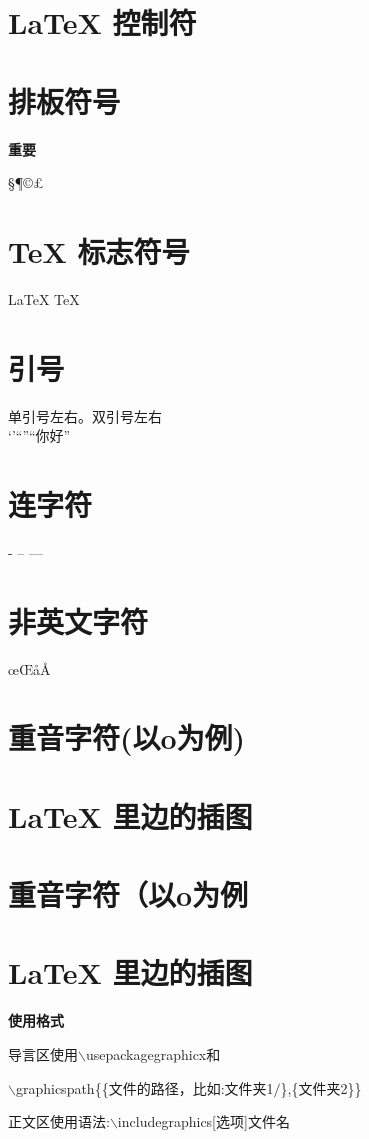 \documentclass[fontset=windows]{article}
\begin{document}
    \section{\LaTeX{} 控制符}
    \section{排板符号}
    \textbf{重要}

    \S \P \dag \ddag \copyright \pounds
    \section{\TeX{} 标志符号}
    \LaTeX{} \TeX{} \LaTeXe{} %
    \section{引号}
    单引号左右。双引号左右\\
    `'``''``你好''
    \section{连字符}
    - -- ---
    \section{非英文字符}
    \oe \OE  \aa \AA
    \section{重音字符(以o为例)}
    \section{\LaTeX{} 里边的插图}
    \section{重音字符（以o为例}

    \section{\LaTeX{} 里边的插图}
    \textbf{使用格式}

    导言区使用$\backslash$usepackage{graphicx}和

    $\backslash$graphicspath\{\{文件的路径，比如:文件夹1$/$\},\{文件夹2\}\}

    正文区使用语法:$\backslash$includegraphics[选项]{文件名}
\end{document}
